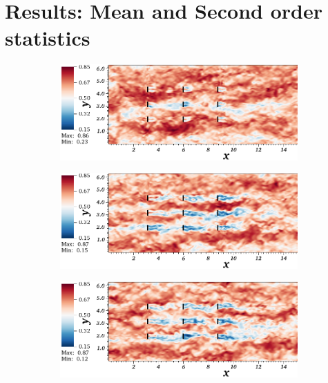 \section{Results: Mean and Second order statistics}
\begin{figure}
\centering
        \begin{subfigure}[t]{0.5\textwidth}
                \includegraphics[width=\linewidth]{movie_xy_cropped/movie_xy_2.png}
                \caption{}
                \label{fig:snap1}
        \end{subfigure}%
        \centering
        \begin{subfigure}[t]{0.5\textwidth}
                \includegraphics[width=\linewidth]{movie_xy_cropped/movie_xy_12.png}
                \caption{}
                \label{fig:snap2}
        \end{subfigure}
       \centering
        \begin{subfigure}[t]{0.5\textwidth}
                \includegraphics[width=\linewidth]{movie_xy_cropped/movie_xy_19.png}

\end{subfigure}
\end{figure}
